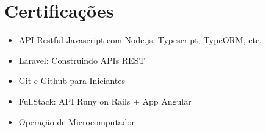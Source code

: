 \documentclass[a4paper,12pt]{article}
\newcommand{\resumeItem}[1]{%
	\item\small{#1}
}
\newcommand{\resumeItemListStart}{\begin{itemize}[rightmargin=0.11in]}
\newcommand{\resumeItemListEnd}{\end{itemize}}
\begin{document}



\section{Certificações}

\resumeItemListStart{}

\resumeItem{API Restful Javascript com Node.js, Typescript, TypeORM, etc.}

\resumeItem{Laravel: Construindo APIs REST}

\resumeItem{Git e Github para Iniciantes}

\resumeItem{FullStack: API Runy on Rails + App Angular}

\resumeItem{Operação de Microcomputador}

\resumeItemListEnd{}

\end{document}
